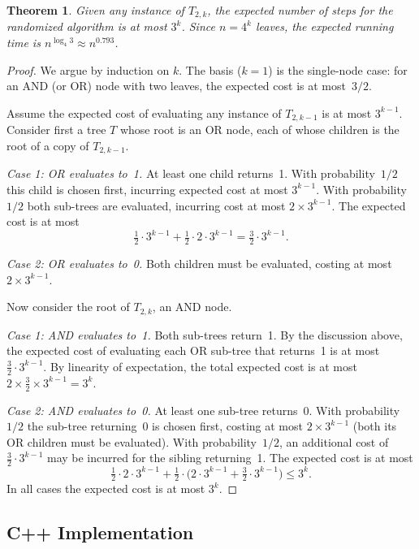 \documentclass[twoside,12pt]{book}
\theoremstyle{plain}
\newtheorem{theorem}{Theorem}[chapter]
\theoremstyle{definition}
\theoremstyle{remark}
\begin{document}
\begin{theorem}
\label{thm:gametree}
Given any instance of $T_{2,k}$, the expected number of steps for the
randomized algorithm is at most $3^k$.  Since $n=4^k$ leaves, the expected
running time is $n^{\log_4 3}\approx n^{0.793}$.
\end{theorem}

\begin{proof}
We argue by induction on $k$.  The basis ($k=1$) is the single-node case:
for an AND (or OR) node with two leaves, the expected cost is at most~$3/2$.

Assume the expected cost of evaluating any instance of $T_{2,k-1}$ is at
most $3^{k-1}$.  Consider first a tree $T$ whose root is an OR node, each of
whose children is the root of a copy of $T_{2,k-1}$.

\emph{Case 1: OR evaluates to~1.}
At least one child returns~1.  With probability~$1/2$ this child is chosen
first, incurring expected cost at most $3^{k-1}$.  With probability~$1/2$
both sub-trees are evaluated, incurring cost at most $2\times 3^{k-1}$.
The expected cost is at most
\[
  \tfrac{1}{2}\cdot 3^{k-1} + \tfrac{1}{2}\cdot 2\cdot 3^{k-1}
  = \tfrac{3}{2}\cdot 3^{k-1}.
\]

\emph{Case 2: OR evaluates to~0.}
Both children must be evaluated, costing at most $2\times 3^{k-1}$.

Now consider the root of $T_{2,k}$, an AND node.

\emph{Case 1: AND evaluates to~1.}
Both sub-trees return~1.  By the discussion above, the expected cost of
evaluating each OR sub-tree that returns~1 is at most
$\frac{3}{2}\cdot 3^{k-1}$.  By linearity of expectation, the total
expected cost is at most $2\times\frac{3}{2}\times 3^{k-1}=3^k$.

\emph{Case 2: AND evaluates to~0.}
At least one sub-tree returns~0.  With probability~$1/2$ the sub-tree
returning~0 is chosen first, costing at most $2\times 3^{k-1}$ (both its OR
children must be evaluated).  With probability~$1/2$, an additional cost of
$\frac{3}{2}\cdot 3^{k-1}$ may be incurred for the sibling returning~1.
The expected cost is at most
\[
  \tfrac{1}{2}\cdot 2\cdot 3^{k-1}
  + \tfrac{1}{2}\cdot\bigl(2\cdot 3^{k-1}+\tfrac{3}{2}\cdot 3^{k-1}\bigr)
  \le 3^k.
\]
In all cases the expected cost is at most $3^k$.
\end{proof}

\subsection{C++ Implementation}
\end{document}

